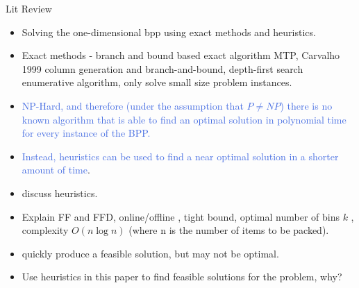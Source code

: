\documentclass{llncs}
\begin{document}
Lit Review
\begin{itemize}
	\item Solving the one-dimensional bpp using exact methods and heuristics.
	\item Exact methods - \cite{martello1990a} branch and bound based exact algorithm MTP, Carvalho 1999 column generation and branch-and-bound, \cite{eilon1971} depth-first search enumerative algorithm, only solve small size problem instances.
	\item \cite{garey1979} \textcolor{RoyalBlue}{NP-Hard, and therefore (under the assumption that $P \neq NP$) there is no known algorithm that is able to find an optimal solution in polynomial time for every instance of the BPP.}
	\item \textcolor{RoyalBlue}{Instead, heuristics can be used to find a near optimal solution in a shorter amount of time}.
	\item discuss heuristics.
	\item Explain FF and FFD, online/offline \cite{eilon1971}, \cite{dosa2007} tight bound, optimal number of bins $k$ \cite{korf2002}, complexity $O(n \log n)$ \cite{coffman1984} (where n is the number of items to be packed).
	\item quickly produce a feasible solution, but may not be optimal.
	\item Use heuristics in this paper to find feasible solutions for the problem, why?
\end{itemize}
\end{document}
